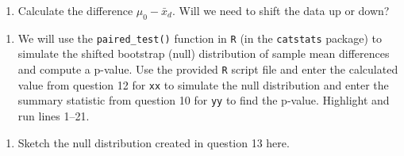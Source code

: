 \documentclass[
]{report}
\newenvironment{Shaded}{\begin{snugshade}}{\end{snugshade}}
\newcommand{\AttributeTok}[1]{\textcolor[rgb]{0.77,0.63,0.00}{#1}}
\newcommand{\CommentTok}[1]{\textcolor[rgb]{0.56,0.35,0.01}{\textit{#1}}}
\newcommand{\DecValTok}[1]{\textcolor[rgb]{0.00,0.00,0.81}{#1}}
\newcommand{\FunctionTok}[1]{\textcolor[rgb]{0.00,0.00,0.00}{#1}}
\newcommand{\NormalTok}[1]{#1}
\newcommand{\SpecialCharTok}[1]{\textcolor[rgb]{0.00,0.00,0.00}{#1}}
\newcommand{\StringTok}[1]{\textcolor[rgb]{0.31,0.60,0.02}{#1}}
\providecommand{\tightlist}{%
  \setlength{\itemsep}{0pt}\setlength{\parskip}{0pt}}
\begin{document}
\begin{enumerate}
\def\labelenumi{\arabic{enumi}.}
\setcounter{enumi}{11}
\tightlist
\item
  Calculate the difference \(\mu_0 - \bar{x}_d\). Will we need to shift the data up or down?
\end{enumerate}

\vspace{.7in}

\begin{enumerate}
\def\labelenumi{\arabic{enumi}.}
\setcounter{enumi}{12}
\tightlist
\item
  We will use the \texttt{paired\_test()} function in \texttt{R} (in the \texttt{catstats} package) to simulate the shifted bootstrap (null) distribution of sample mean differences and compute a p-value. Use the provided \texttt{R} script file and enter the calculated value from question 12 for \texttt{xx} to simulate the null distribution and enter the summary statistic from question 10 for \texttt{yy} to find the p-value. Highlight and run lines 1--21.
\end{enumerate}

\begin{Shaded}
\end{Shaded}

\newpage

\begin{enumerate}
\def\labelenumi{\arabic{enumi}.}
\setcounter{enumi}{13}
\tightlist
\item
  Sketch the null distribution created in question 13 here.
\end{enumerate}
\end{document}

